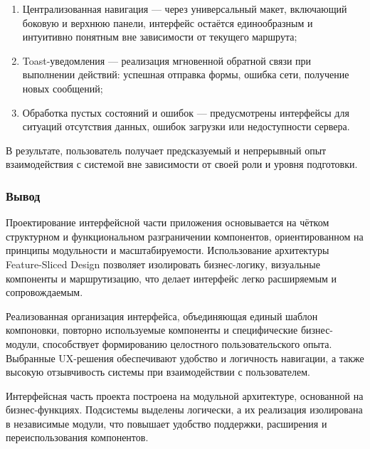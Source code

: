 \begin{enumerate}
  \item Централизованная навигация — через универсальный макет, включающий боковую и верхнюю панели, интерфейс остаётся единообразным и интуитивно понятным вне зависимости от текущего маршрута;
  \item Toast-уведомления — реализация мгновенной обратной связи при выполнении действий: успешная отправка формы, ошибка сети, получение новых сообщений;
  \item Обработка пустых состояний и ошибок — предусмотрены интерфейсы для ситуаций отсутствия данных, ошибок загрузки или недоступности сервера.
\end{enumerate}

В результате, пользователь получает предсказуемый и непрерывный опыт взаимодействия с системой вне зависимости от своей роли и уровня подготовки.

\subsubsection*{Вывод}

Проектирование интерфейсной части приложения основывается на чётком структурном и функциональном разграничении компонентов, ориентированном на принципы модульности и масштабируемости. Использование архитектуры Feature-Sliced Design позволяет изолировать бизнес-логику, визуальные компоненты и маршрутизацию, что делает интерфейс легко расширяемым и сопровождаемым.

Реализованная организация интерфейса, объединяющая единый шаблон компоновки, повторно используемые компоненты и специфические бизнес-модули, способствует формированию целостного пользовательского опыта. Выбранные UX-решения обеспечивают удобство и логичность навигации, а также высокую отзывчивость системы при взаимодействии с пользователем.


Интерфейсная часть проекта построена на модульной архитектуре, основанной на бизнес-функциях. Подсистемы выделены логически, а их реализация изолирована в независимые модули, что повышает удобство поддержки, расширения и переиспользования компонентов.